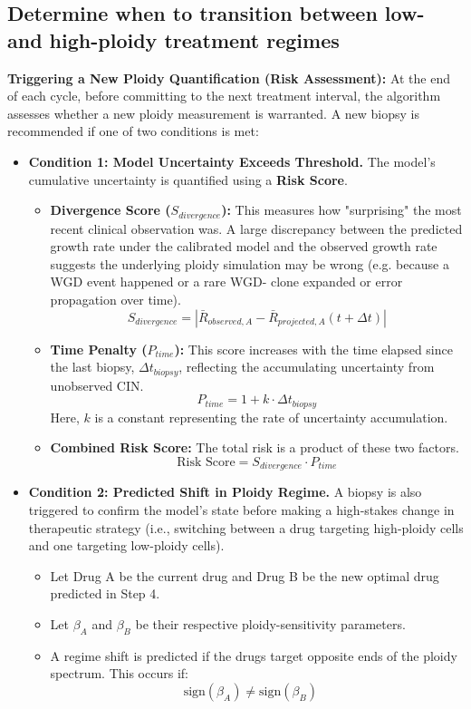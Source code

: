 \documentclass{article}
\begin{document}
\subsection{Determine when to transition between low- and high-ploidy treatment regimes}


\textbf{Triggering a New Ploidy Quantification (Risk Assessment):}
    At the end of each cycle, before committing to the next treatment interval, the algorithm assesses whether a new ploidy measurement is warranted. A new biopsy is recommended if one of two conditions is met:
    \begin{itemize}
        \item \textbf{Condition 1: Model Uncertainty Exceeds Threshold.} The model's cumulative uncertainty is quantified using a \textbf{Risk Score}.
        \begin{itemize}
            \item \textbf{Divergence Score ($S_{divergence}$):} \color{blue} This measures how "surprising" the most recent clinical observation was. A large discrepancy between the predicted growth rate under the calibrated model and the observed growth rate suggests the underlying ploidy simulation may be wrong (e.g. because a WGD event happened or a rare WGD- clone expanded or error propagation over time).
            $$ S_{divergence} = |\bar{R}_{observed, A} - \bar{R}_{projected, A}(t+\Delta t)| $$
            \color{black} 
            \item \textbf{Time Penalty ($P_{time}$):} This score increases with the time elapsed since the last biopsy, $\Delta t_{biopsy}$, reflecting the accumulating uncertainty from unobserved CIN.
            $$ P_{time} = 1 + k \cdot \Delta t_{biopsy} $$
            Here, $k$ is a constant representing the rate of uncertainty accumulation.
            \item \textbf{Combined Risk Score:} The total risk is a product of these two factors.
            $$ \text{Risk Score} = S_{divergence} \cdot P_{time} $$
        \end{itemize}

        \item \textbf{Condition 2: Predicted Shift in Ploidy Regime.} \color{blue} A biopsy is also triggered to confirm the model's state before making a high-stakes change in therapeutic strategy (i.e., switching between a drug targeting high-ploidy cells and one targeting low-ploidy cells). \color{black} 
        \begin{itemize}
            \item Let Drug A be the current drug and Drug B be the new optimal drug predicted in Step 4.
            \item Let $\beta_A$ and $\beta_B$ be their respective ploidy-sensitivity parameters.
            \item A regime shift is predicted if the drugs target opposite ends of the ploidy spectrum. This occurs if:
            $$ \text{sign}(\beta_A) \neq \text{sign}(\beta_B) \quad  $$
        \end{itemize}


\end{itemize}
\end{document}
